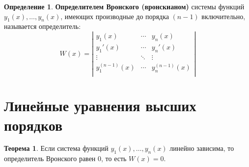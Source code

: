 \documentclass{report}
\theoremstyle{definition}
\newtheorem{definition}{Определение}[section]
\newtheorem{theorem}{Теорема}[section]
\begin{document}
\begin{definition}
    \textbf{Определителем Вронского (вронскианом)} системы функций $y_1(x),\ldots,y_n(x)$, имеющих производные до порядка $(n-1)$ включительно, называется определитель:
    \begin{equation*}
        W(x) = \left|\begin{array}{ccc}
            y_1(x)         & \cdots & y_n(x)         \\
            y_1'(x)        & \cdots & y_n'(x)        \\
            \vdots         & \ddots & \vdots         \\
            y_1^{(n-1)}(x) & \cdots & y_n^{(n-1)}(x) \\
        \end{array}\right|
    \end{equation*}
\end{definition}

\section{Линейные уравнения высших порядков}

\begin{theorem}
    Если система функций $y_1(x), \ldots, y_n(x)$ линейно зависима, то определитель Вронского равен $0$, то есть $W(x) = 0$.
\end{theorem}
\end{document}
